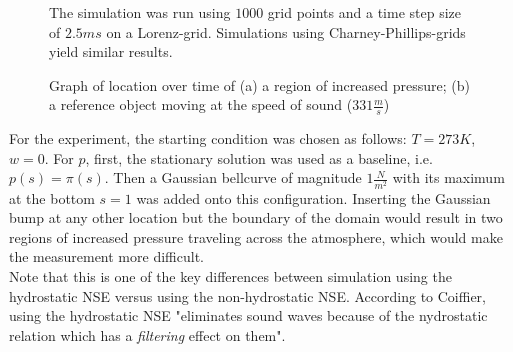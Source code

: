 \begin{figure}[!h]
    \caption{Graph of location over time of (a) a region of increased pressure; (b) a reference object moving at the speed of sound ($331\frac{m}{s}$)}
    \label{fig:sound_speed}
    \small
    The simulation was run using $1000$ grid points and a time step size of $2.5ms$ on a Lorenz-grid. Simulations using Charney-Phillips-grids yield similar results.
\end{figure}

For the experiment, the starting condition was chosen as follows: $T=273K$, $w=0$.
For $p$, first, the stationary solution was used as a baseline, i.e. $p(s)=\pi (s)$.
Then a Gaussian bellcurve of magnitude $1\frac{N}{m^2}$ with its maximum at the bottom $s=1$ was added onto this configuration.
Inserting the Gaussian bump at any other location but the boundary of the domain would result in two regions of increased pressure traveling across the atmosphere, which would make the measurement more difficult.\\
Note that this is one of the key differences between simulation using the hydrostatic NSE versus using the non-hydrostatic NSE.
According to Coiffier, using the hydrostatic NSE "eliminates sound waves because of the nydrostatic relation which has a \emph{filtering} effect on them"\cite{coiffier2011fundamentals}.

